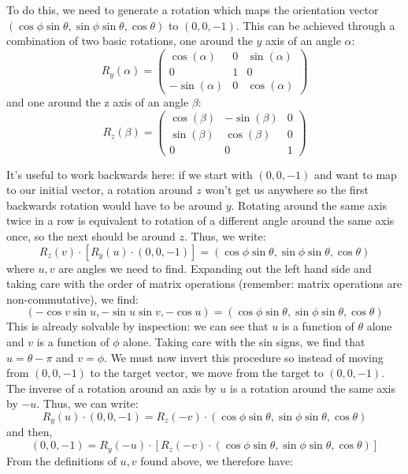 \documentclass[10pt,a4paper,onecolumn]{report}
\begin{document}
To do this, we need to generate a rotation which maps the orientation vector $( \cos \phi \sin \theta,  \sin \phi \sin \theta,  \cos \theta)$ to $  (0,0,-1)$. This can be achieved through a combination of two basic rotations, one around the $y$ axis of an angle $\alpha$:
\begin{equation}
R_y(\alpha) = \begin{pmatrix} \cos (\alpha) & 0 & \sin (\alpha) \\
 0 & 1 & 0 \\
 -\sin (\alpha) & 0 & \cos (\alpha) \end{pmatrix}
\end{equation}
and one around the z axis of an angle $\beta$:
\begin{equation}
R_z(\beta) =  \begin{pmatrix}  \cos (\beta) & -\sin (\beta) & 0 \\
 \sin (\beta) & \cos (\beta) & 0 \\
 0 & 0 & 1  \end{pmatrix}
\end{equation}
 


It's useful to work backwards here: if we start with $(0,0,-1)$ and want to map to our initial vector, a rotation around $z$ won't get us anywhere so the first backwards rotation would have to be around $y$. Rotating around the same axis twice in a row is equivalent to rotation of a different angle around the same axis once, so the next should be around $z$. Thus, we write:
\begin{equation}
R_z(v) \cdot \left[R_y(u) \cdot (0,0,-1) \right] = ( \cos \phi \sin \theta,  \sin \phi \sin \theta,  \cos \theta)
\end{equation}
where $u,v$ are angles we need to find. Expanding out the left hand side and taking care with the order of matrix operations (remember: matrix operations are non-commutative), we find:
\begin{equation}
( - \cos v \sin u,  -\sin u \sin v,  -\cos u) = ( \cos \phi \sin \theta,  \sin \phi \sin \theta,  \cos \theta)
\end{equation}
This is already solvable by inspection: we can see that $u$ is a function of $\theta$ alone and $v$ is a function of $\phi$ alone. Taking care with the sin signs, we find that $u = \theta - \pi$ and $v = \phi$. We must now invert this procedure so instead of moving from $(0,0,-1)$ to the target vector, we move from the target to $(0,0,-1)$. The inverse of a rotation around an axis by $u$ is a rotation around the same axis by $-u$. Thus, we can write: 
\begin{equation}
R_y(u) \cdot (0,0,-1)  = R_z(-v) \cdot ( \cos \phi \sin \theta,  \sin \phi \sin \theta,  \cos \theta)
\end{equation}
and then,
\begin{equation}
 (0,0,-1)  =R_y(-u) \cdot \left[ R_z(-v) \cdot ( \cos \phi \sin \theta,  \sin \phi \sin \theta,  \cos \theta) \right]
\end{equation}
From the definitions of $u,v$ found above, we therefore have:
\end{document}
